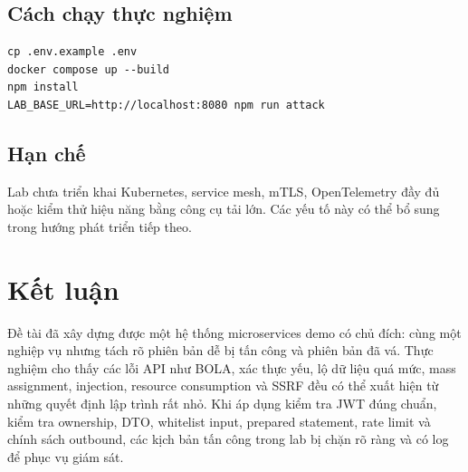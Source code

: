 \documentclass[12pt,a4paper]{report}
\begin{document}
\section{Cách chạy thực nghiệm}
\begin{lstlisting}
cp .env.example .env
docker compose up --build
npm install
LAB_BASE_URL=http://localhost:8080 npm run attack
\end{lstlisting}

\section{Hạn chế}
Lab chưa triển khai Kubernetes, service mesh, mTLS, OpenTelemetry đầy đủ hoặc kiểm thử hiệu năng bằng công cụ tải lớn. Các yếu tố này có thể bổ sung trong hướng phát triển tiếp theo.

\chapter{Kết luận}
Đề tài đã xây dựng được một hệ thống microservices demo có chủ đích: cùng một nghiệp vụ nhưng tách rõ phiên bản dễ bị tấn công và phiên bản đã vá. Thực nghiệm cho thấy các lỗi API như BOLA, xác thực yếu, lộ dữ liệu quá mức, mass assignment, injection, resource consumption và SSRF đều có thể xuất hiện từ những quyết định lập trình rất nhỏ. Khi áp dụng kiểm tra JWT đúng chuẩn, kiểm tra ownership, DTO, whitelist input, prepared statement, rate limit và chính sách outbound, các kịch bản tấn công trong lab bị chặn rõ ràng và có log để phục vụ giám sát.



\end{document}
